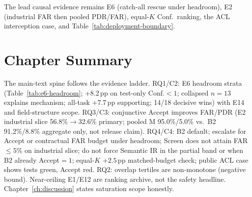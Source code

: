 \noindent The lead causal evidence remains E6 (catch-all rescue under
headroom), E2 (industrial FAR then pooled PDR/FAR), equal-$K$ Conf.\ ranking,
the ACL interception case, and Table~\ref{tab:deployment-boundary}.

\section*{Chapter Summary}

The main-text spine follows the evidence ladder.
RQ1/C2: E6 headroom strata (Table~\ref{tab:e6-headroom}; +8.2\,pp on
test-only Conf.${<}1$; collapsed $n{=}13$ explains mechanism; all-task
+7.7\,pp supporting; 14/18 decisive wins) with E14 and field-structure scope.
RQ3/C3: conjunctive Accept improves FAR/PDR (E2 industrial slice
56.8\%$\to$32.6\% primary; pooled M 95.0\%/5.0\% vs.\ B2 91.2\%/8.8\%
aggregate only, not release claim).
RQ4/C4: B2 default; escalate for Accept or contractual FAR budget under
headroom; Screen does not attain FAR${\le}5\%$ on industrial slice; do not
force Semantic IR in the partial band or when B2 already Accept${=}1$; equal-$K$
${+}2.5$\,pp matched-budget check; public ACL case shows tests green, Accept
red.
RQ2: overlap tertiles are non-monotone (negative bound).
Near-ceiling E1/E12 are ranking archive, not the safety headline.
Chapter~\ref{ch:discussion} states saturation scope honestly.
